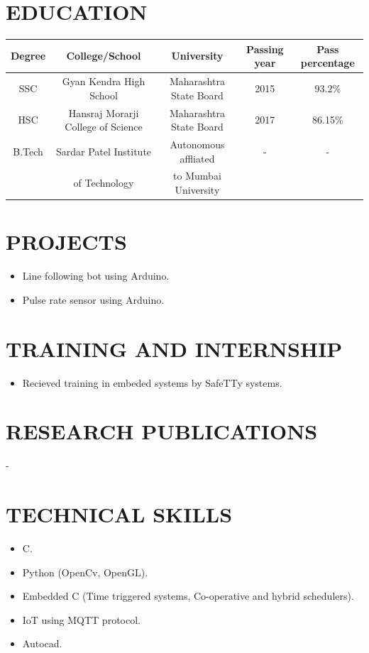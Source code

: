 \documentclass{article}
\begin{document}
\section*{\textbf{EDUCATION}}
\begin{tabular}{|c|c|c|c|c|}
\hline
Degree & College/School & University & Passing year & Pass percentage\\
\hline
SSC & Gyan Kendra High School & Maharashtra State Board & 2015 & 93.2\%\\
\hline
HSC & Hansraj Morarji College of Science & Maharashtra State Board & 2017 & 86.15\%\\
\hline
B.Tech & Sardar Patel Institute& Autonomous affliated  & - & -\\
 & of Technology & to Mumbai University & & \\
\hline 
\end{tabular}


\section*{\textbf{PROJECTS}}
\begin{itemize}
\item Line following bot using Arduino.
\item Pulse rate sensor using Arduino.
\end{itemize}

\section*{\textbf{TRAINING AND INTERNSHIP}}
\begin{itemize}
\item Recieved training in embeded systems by SafeTTy systems.
\end{itemize}


\section*{\textbf{RESEARCH PUBLICATIONS}}
-

\section*{\textbf{TECHNICAL SKILLS}}
\begin{itemize}
\item C.
\item Python (OpenCv, OpenGL).
\item Embedded C (Time triggered systems, Co-operative and hybrid schedulers).
\item IoT using MQTT protocol.
\item Autocad.
\end{itemize}
\end{document}
